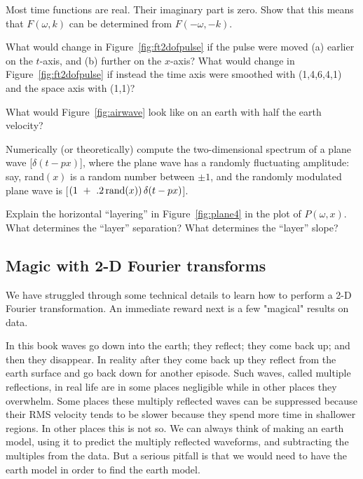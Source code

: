 \begin{exer}
\item
Most time functions are real.
Their imaginary part is zero.
Show that this means that  $F( \omega , k )$  can
be determined from  $F( - \omega , - k )$.
\item
What would change in Figure~\ref{fig:ft2dofpulse}
if the pulse were moved
(a) earlier on the $t$-axis,  and
(b) further on the $x$-axis?
What would change in Figure~\ref{fig:ft2dofpulse}
if instead
the time axis were smoothed with (1,4,6,4,1)
and the space axis with (1,1)?
\item
What would Figure~\ref{fig:airwave}
look like on an earth with half the earth velocity?
\item
Numerically (or theoretically)
compute the two-dimensional spectrum
of a plane wave [$\delta (t-px)$], where
the plane wave has a randomly fluctuating amplitude:
say, rand$(x)$ is a random number between $\pm 1$,
and the randomly modulated plane wave is
[$(1 \ +\ .2\,{\rm rand}(x)) \, \delta (t-px)$].
\item
Explain the horizontal ``layering'' in Figure~\ref{fig:plane4}
in the plot of  $P( \omega  , x)$.
What determines the ``layer'' separation?
What determines the ``layer'' slope?
\end{exer}


\subsection{Magic with 2-D Fourier transforms}
We have struggled through some technical details
to learn how to perform a 2-D Fourier transformation.
An immediate reward next is a few "magical" results on data.

\par
In this book waves go down into the earth; they reflect;
they come back up; and then they disappear.
In reality after they come back up they reflect
from the earth surface and go back down for another episode.
Such waves, called multiple reflections,
in real life are in some places negligible
while in other places they overwhelm.
Some places these multiply reflected waves can be suppressed
because their RMS velocity tends to be slower
because they spend more time in shallower regions.
In other places this is not so.
We can always think of making an earth model,
using it to predict the multiply reflected waveforms,
and subtracting the multiples from the data.
But a serious pitfall is that we would need to have the earth model
in order to find the earth model.


